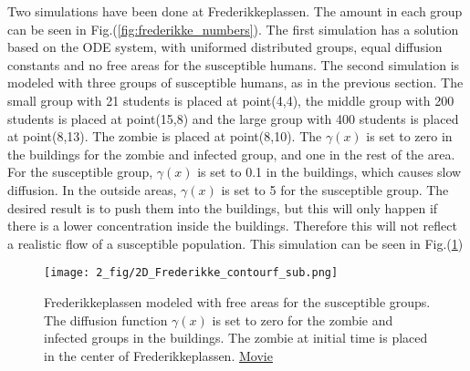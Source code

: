 \documentclass[%
twoside,                 %
final,                   %
chapterprefix=true,      %
open=right               %
10pt]{book}
\begin{document}
\vspace{3mm}




\vspace{3mm}


Two simulations have been done at Frederikkeplassen. The amount in each group can be seen in Fig.(\ref{fig:frederikke_numbers}). The first simulation has a solution based on the ODE system, with uniformed distributed groups, equal diffusion constants and no free areas for the susceptible humans. The second simulation is modeled with three groups of susceptible humans, as in the previous section. The small group with 21 students is placed at point(4,4), the middle group with 200 students is placed at point(15,8) and the large group with 400 students is placed at point(8,13). The zombie is placed at point(8,10). The $\gamma(x)$ is set to zero in the buildings for the zombie and infected group, and one in the rest of the area. For the susceptible group, $\gamma(x)$ is set to 0.1 in the buildings, which causes slow diffusion. In the outside areas, $\gamma(x)$ is set to 5 for the susceptible group. The desired result is to push them into the buildings, but this will only happen if there is a lower concentration inside the buildings. Therefore this will not reflect a realistic flow of a susceptible population. This simulation can be seen in Fig.(\ref{fig:frederikke_free_area})  


\begin{figure}[ht]
  \centerline{\texttt{[image: 2\_fig/2D\_Frederikke\_contourf\_sub.png]}}
  \caption{
  \label{fig:frederikke_free_area} Frederikkeplassen modeled with free areas for the susceptible groups. The diffusion function $\gamma(x)$ is set to zero for the zombie and infected groups in the buildings. The zombie at initial time is placed in the center of Frederikkeplassen. \href{{https://torbjornseland.github.io/master}}{Movie}
  }
\end{figure}




\vspace{3mm}




\vspace{3mm}
\end{document}
